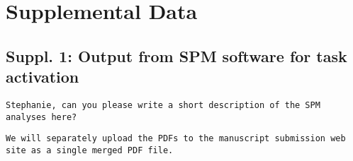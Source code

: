\section*{Supplemental Data}
\subsection{Suppl. 1: Output from SPM software for task activation}
\verb|Stephanie, can you please write a short description of the SPM analyses here?|

\verb|We will separately upload the PDFs to the manuscript submission web site as a single merged PDF file.|
